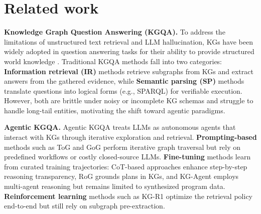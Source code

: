 \section{Related work}
\label{sec:related_work}

\textbf{Knowledge Graph Question Answering (KGQA).}
To address the limitations of unstructured text retrieval and LLM hallucination, KGs have been widely adopted in question answering tasks for their ability to provide structured world knowledge \citep{baek2023knowledgeaugmentedlanguagemodelverification, xu2025knowledgeinfusedpromptingassessingadvancing}.
Traditional KGQA methods fall into two categories: \textbf{Information retrieval (IR)} methods \citep{Zhang_2022, dong2023bridgingkbtextgapleveraging, li2024chainofknowledgegroundinglargelanguage} retrieve subgraphs from KGs and extract answers from the gathered evidence, while \textbf{Semantic parsing (SP)} methods \citep{berant2013semantic, yih2015semantic, li2023fewshotincontextlearningknowledge, Luo_2024} translate questions into logical forms (e.g., SPARQL) for verifiable execution.
However, both are brittle under noisy or incomplete KG schemas and struggle to handle long-tail entities, motivating the shift toward agentic paradigms.

\textbf{Agentic KGQA.}
Agentic KGQA treats LLMs as autonomous agents that interact with 
KGs through iterative exploration and retrieval.
\textbf{Prompting-based} methods such as ToG \citep{sun2023think} and GoG \citep{xu2024generate} perform iterative graph traversal but rely on predefined workflows or costly closed-source LLMs.
\textbf{Fine-tuning} methods learn from curated training trajectories: CoT-based approaches \citep{wu2025cotkrchainofthoughtenhancedknowledge, Zhao2024KGCoTCP} enhance step-by-step reasoning transparency, RoG \citep{luo2023reasoning} grounds plans in KGs, and KG-Agent \citep{jiang2025kg} employs multi-agent reasoning but 
remains limited to synthesized program data.
\textbf{Reinforcement learning} methods such as KG-R1 \citep{song2025efficient} optimize the retrieval policy end-to-end but still rely on subgraph pre-extraction.


